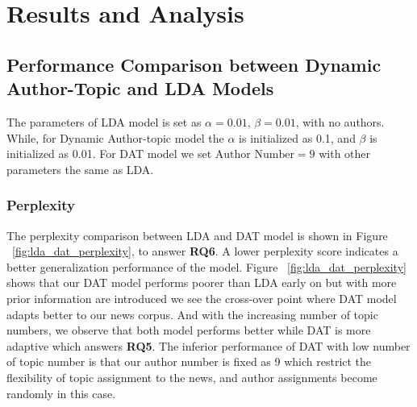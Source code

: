 \chapter{Results and Analysis}
\label{chapterlabel5}

\section{Performance Comparison between Dynamic Author-Topic and LDA Models}\label{sec:ldadat}

The parameters of LDA  model is set as $\alpha = 0.01$, $\beta = 0.01$, with no authors.
While, for Dynamic Author-topic model the $\alpha$  is initialized as 0.1, and $\beta$ is initialized as 0.01. For DAT model we set $\text{Author Number} = 9$ with other parameters the same as LDA. 

\subsection{Perplexity}
The perplexity comparison between LDA and DAT model is shown in Figure ~\ref{fig:lda_dat_perplexity}, to answer \textbf{RQ6}. A lower perplexity score indicates a better generalization performance of the model. Figure ~\ref{fig:lda_dat_perplexity} shows that our DAT model performs poorer than LDA early on but with more prior information are introduced we see the cross-over point where DAT model adapts better to our news corpus. And with the increasing number of topic numbers, we observe that both model performs better while DAT is more adaptive which answers \textbf{RQ5}. The inferior performance of DAT with low number of topic number is that our author number is fixed as 9 which restrict the flexibility of topic assignment to the news, and author assignments become randomly in this case.

